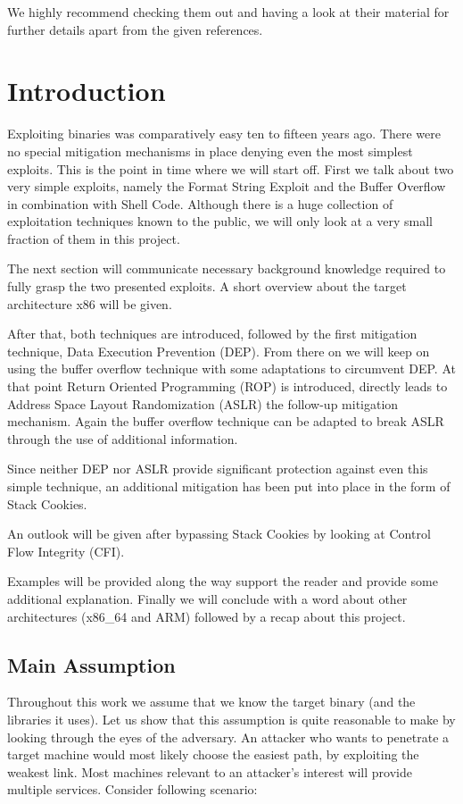\documentclass[article]{uibk}
\begin{document}
We highly recommend checking them out and having a look at their material for
further details apart from the given references.

\section{Introduction}

Exploiting binaries was comparatively easy ten to fifteen years ago. There were
no special mitigation mechanisms in place denying even the most simplest
exploits. This is the point in time where we will start off. First we talk
about two very simple exploits, namely the Format String Exploit and the Buffer
Overflow in combination with Shell Code. Although there is a huge collection of
exploitation techniques known to the public, we will only look at a very small
fraction of them in this project.

The next section will communicate necessary background knowledge required to
fully grasp the two presented exploits. A short overview about the target
architecture x86 will be given.

After that, both techniques are introduced, followed by the first mitigation
technique, Data Execution Prevention (DEP). From there on we will keep on using
the buffer overflow technique with some adaptations to circumvent DEP. At that
point Return Oriented Programming (ROP) is introduced, directly leads to
Address Space Layout Randomization (ASLR) the follow-up mitigation mechanism.
Again the buffer overflow technique can be adapted to break ASLR through the
use of additional information.

Since neither DEP nor ASLR provide significant protection against even this
simple technique, an additional mitigation has been put into place in the form
of Stack Cookies.

An outlook will be given after bypassing Stack Cookies by looking at Control
Flow Integrity (CFI).

Examples will be provided along the way support the reader and provide some
additional explanation. Finally we will conclude with a word about other
architectures (x86\_64 and ARM) followed by a recap about this project.

\subsection{Main Assumption}

Throughout this work we assume that we know the target binary (and the
libraries it uses). Let us show that this assumption is quite reasonable to
make by looking through the eyes of the adversary. An attacker who wants to
penetrate a target machine would most likely choose the easiest path, by
exploiting the weakest link. Most machines relevant to an attacker's interest
will provide multiple services. Consider following scenario:
\end{document}
